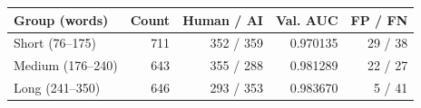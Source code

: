 \par\noindent
\begin{tabularx}{\linewidth}{@{}Yrrrr@{}}
\toprule
Group (words) & Count & Human / AI & Val. AUC & FP / FN \\
\midrule
Short (76--175) & 711 & 352 / 359 & 0.970135 & 29 / 38 \\
Medium (176--240) & 643 & 355 / 288 & 0.981289 & 22 / 27 \\
Long (241--350) & 646 & 293 / 353 & 0.983670 & 5 / 41 \\
\bottomrule
\end{tabularx}
\par
